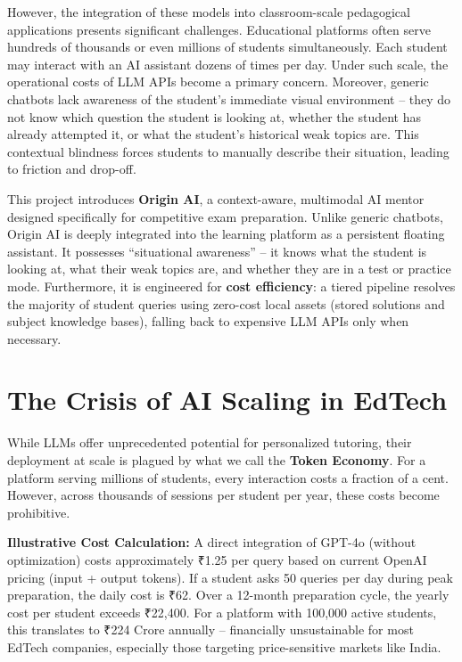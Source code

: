 However, the integration of these models into classroom-scale pedagogical applications presents significant challenges. Educational platforms often serve hundreds of thousands or even millions of students simultaneously. Each student may interact with an AI assistant dozens of times per day. Under such scale, the operational costs of LLM APIs become a primary concern. Moreover, generic chatbots lack awareness of the student's immediate visual environment – they do not know which question the student is looking at, whether the student has already attempted it, or what the student's historical weak topics are. This contextual blindness forces students to manually describe their situation, leading to friction and drop-off.

This project introduces \textbf{Origin AI}, a context-aware, multimodal AI mentor designed specifically for competitive exam preparation. Unlike generic chatbots, Origin AI is deeply integrated into the learning platform as a persistent floating assistant. It possesses ``situational awareness'' – it knows what the student is looking at, what their weak topics are, and whether they are in a test or practice mode. Furthermore, it is engineered for \textbf{cost efficiency}: a tiered pipeline resolves the majority of student queries using zero-cost local assets (stored solutions and subject knowledge bases), falling back to expensive LLM APIs only when necessary.

\section{The Crisis of AI Scaling in EdTech}

While LLMs offer unprecedented potential for personalized tutoring, their deployment at scale is plagued by what we call the \textbf{Token Economy}. For a platform serving millions of students, every interaction costs a fraction of a cent. However, across thousands of sessions per student per year, these costs become prohibitive.

\textbf{Illustrative Cost Calculation:}  
A direct integration of GPT-4o (without optimization) costs approximately ₹1.25 per query based on current OpenAI pricing (input + output tokens). If a student asks 50 queries per day during peak preparation, the daily cost is ₹62. Over a 12-month preparation cycle, the yearly cost per student exceeds ₹22,400. For a platform with 100,000 active students, this translates to ₹224 Crore annually – financially unsustainable for most EdTech companies, especially those targeting price-sensitive markets like India.


